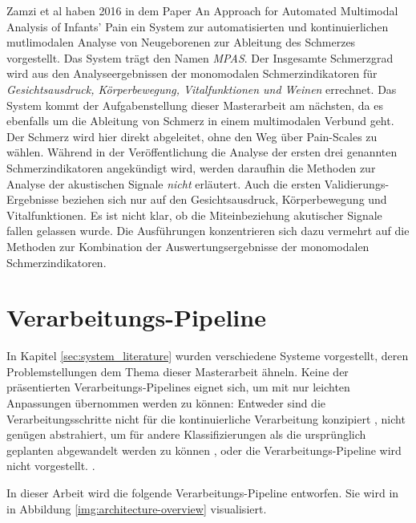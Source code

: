Zamzi et al  haben 2016 in dem Paper \glqq An Approach for Automated Multimodal Analysis of Infants' Pain\grqq{} \cite{zamziMultimodal} ein System zur automatisierten und kontinuierlichen mutlimodalen Analyse von Neugeborenen zur Ableitung des Schmerzes vorgestellt. Das System trägt den Namen \emph{MPAS}. Der Insgesamte Schmerzgrad wird aus den Analyseergebnissen der monomodalen Schmerzindikatoren für \emph{Gesichtsausdruck, Körperbewegung, Vitalfunktionen und Weinen} errechnet. Das System kommt der Aufgabenstellung dieser Masterarbeit am nächsten, da es ebenfalls um die Ableitung von Schmerz in einem multimodalen Verbund geht. Der Schmerz wird hier \grqq direkt\glqq{} abgeleitet, ohne den Weg über Pain-Scales zu wählen. Während in der Veröffentlichung die Analyse der ersten drei genannten Schmerzindikatoren angekündigt wird, werden daraufhin die Methoden zur Analyse der akustischen Signale \emph{nicht} erläutert. Auch die ersten Validierungs-Ergebnisse beziehen sich nur auf den Gesichtsausdruck, Körperbewegung und Vitalfunktionen. Es ist nicht klar, ob die Miteinbeziehung akutischer Signale fallen gelassen wurde. Die Ausführungen konzentrieren sich dazu vermehrt auf die Methoden zur Kombination der Auswertungsergebnisse der monomodalen Schmerzindikatoren.

\section{Verarbeitungs-Pipeline}

In Kapitel \ref{sec:system_literature} wurden verschiedene Systeme vorgestellt, deren Problemstellungen dem Thema dieser Masterarbeit ähneln. Keine der präsentierten Verarbeitungs-Pipelines eignet sich, um mit nur leichten Anpassungen übernommen werden zu können: Entweder sind die Verarbeitungsschritte nicht für die kontinuierliche Verarbeitung konzipiert \cite{class_abdulaziz} \cite{comparisonOfLearning} \cite{cry_thesis}, nicht genügen abstrahiert, um für andere Klassifizierungen als die ursprünglich geplanten abgewandelt werden zu können \cite{cohenCry}, oder die Verarbeitungs-Pipeline wird nicht vorgestellt. \cite{palEmotion} \cite{zamziMultimodal}.

In dieser Arbeit wird die folgende Verarbeitungs-Pipeline entworfen. Sie wird in in Abbildung \ref{img:architecture-overview} visualisiert. 

